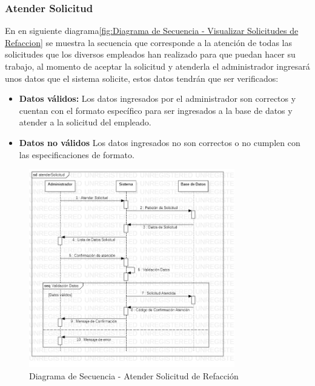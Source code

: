\subsubsection{Atender Solicitud}
En en siguiente diagrama\ref{fig:Diagrama de Secuencia - Visualizar Solicitudes de Refaccion} se muestra la secuencia que corresponde a la atención de todas las solicitudes que los diversos empleados han realizado para que puedan hacer su trabajo, al momento de aceptar la solicitud y atenderla el administrador ingresará unos datos que el sistema solicite, estos datos tendrán que ser verificados:
\begin{itemize}
	\item \textbf{Datos válidos:} Los datos ingresados por el administrador son correctos y cuentan con el formato específico para ser ingresados a la base de datos y atender a la solicitud del empleado.  
	\item \textbf{Datos no válidos} Los datos ingresados no son correctos o no cumplen con las especificaciones de formato.
\end{itemize}
\begin{figure}[!h]
	\centering
	\includegraphics[width=0.8\textwidth]{./diseno/vprocesos/imagenes/atenderSolicitud}
	\caption{Diagrama de Secuencia - Atender Solicitud de Refacción}
	\label{fig:Diagrama de Secuencia - Atender Solicitud de Refaccion}
\end{figure}
\clearpage